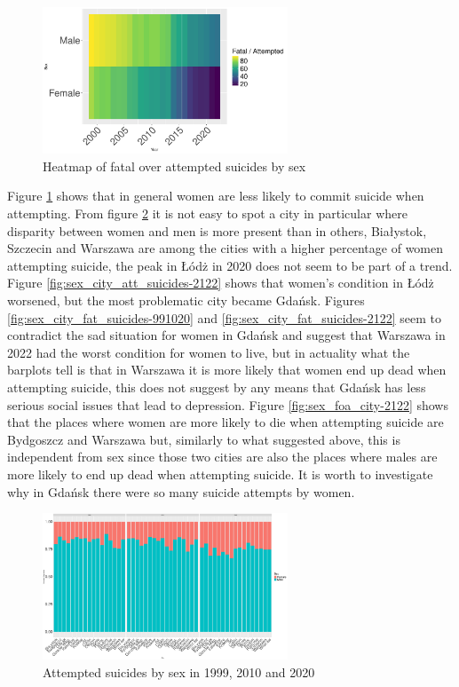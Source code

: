 \documentclass{article}
\begin{document}
\begin{figure}[H]
    \centering
    \includegraphics[width=0.65\textwidth]{imgs/sex_foa_heat.pdf}
    \caption{Heatmap of fatal over attempted suicides by sex}
    \label{fig:sex_foa_heat}
\end{figure}
%
%
Figure \ref{fig:sex_foa_heat} shows that in general women are less likely to commit
suicide when attempting.
%
From figure \ref{fig:sex_city_att_suicides-991020} it is not easy to spot a city in particular
where disparity between women and men is more present than in others,
Białystok, Szczecin and Warszawa are among the cities with a higher percentage
of women attempting suicide, the peak in Łódż in 2020 does not seem to be part of a trend.
Figure \ref{fig:sex_city_att_suicides-2122} shows that women's condition in Łódż worsened,
but the most problematic city became Gdańsk.
Figures \ref{fig:sex_city_fat_suicides-991020} and \ref{fig:sex_city_fat_suicides-2122}
seem to contradict the sad situation for women in Gdańsk and suggest that Warszawa
in 2022 had the worst condition for women to live, but in actuality what the barplots tell is
that in Warszawa it is more likely that women end up dead when attempting suicide,
this does not suggest by any means that Gdańsk has less serious social issues that lead
to depression.
Figure \ref{fig:sex_foa_city-2122} shows that the places where women are more likely to die 
when attempting 
suicide are Bydgoszcz and Warszawa but, similarly to what suggested above, 
this is independent from sex since those two cities are also the places where males are
more likely to end up dead when attempting suicide.
It is worth to investigate why in Gdańsk there were so many suicide attempts by women.
%
%
%
\begin{figure}[H]
    \centering
    \includegraphics[width=0.65\textwidth]{imgs/sex_city_att_suicides-991020.pdf}
    \caption{Attempted suicides by sex  in 1999, 2010 and 2020}
    \label{fig:sex_city_att_suicides-991020}
\end{figure}
\end{document}
